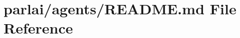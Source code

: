 \hypertarget{parlai_2agents_2README_8md}{}\section{parlai/agents/\+R\+E\+A\+D\+ME.md File Reference}
\label{parlai_2agents_2README_8md}
